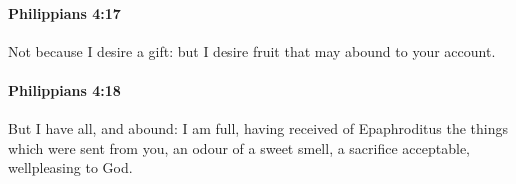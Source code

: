 		\paragraph{Philippians 4:17} %
			\label{PHILIPPIANS-4-17}

			Not because I desire a gift: but I desire fruit that may abound to your account.

			\begin{framed}
			\scriptsize
				\begin{compactdesc}
					\item[SBLG] 
				\end{compactdesc}
			\end{framed}

		\paragraph{Philippians 4:18} %
			\label{PHILIPPIANS-4-18}

			But I have all, and abound: I am full, having received of Epaphroditus the things which were sent from you, an odour of a sweet smell, a sacrifice acceptable, wellpleasing to God.

